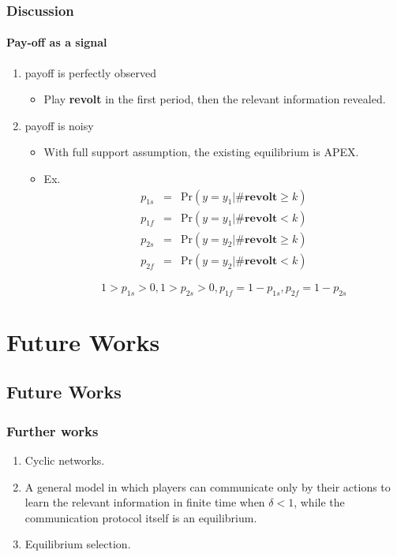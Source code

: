 \documentclass[9pt]{beamer}
\begin{document}
\begin{frame}
\frametitle{Discussion}
\framesubtitle{Pay-off as a signal}
\begin{enumerate}

\item payoff is perfectly observed
\begin{itemize}
\item Play \textbf{revolt} in the first period, then the relevant information revealed.

\end{itemize}
\item payoff is noisy
\begin{itemize}
\item With full support assumption, the existing equilibrium is APEX.
\item Ex. 
\begin{eqnarray*}
p_{1s} &=& \mathrm {Pr}(y=y_1|\#\textbf{revolt}\geq k) \\
p_{1f} &=& \mathrm {Pr}(y=y_1|\#\textbf{revolt}< k) \\
p_{2s} &=& \mathrm {Pr}(y=y_2|\#\textbf{revolt}\geq k) \\
p_{2f} &=& \mathrm {Pr}(y=y_2|\#\textbf{revolt}< k) 
\end{eqnarray*}

\begin{equation}
1>p_{1s}>0,1>p_{2s}>0,p_{1f}=1-p_{1s},p_{2f}=1-p_{2s}
\end{equation}
\end{itemize}


\end{enumerate}


\end{frame}


\section{Future Works}
\subsection{Future Works}


\begin{frame}

\frametitle{Further works}


\begin{enumerate}
\item Cyclic networks.
\item A general model in which players can communicate only by their actions to learn the relevant information in finite time when $\delta<1$, while the communication protocol itself is an equilibrium.
\item Equilibrium selection.  

\end{enumerate}
\end{frame}
\end{document}
